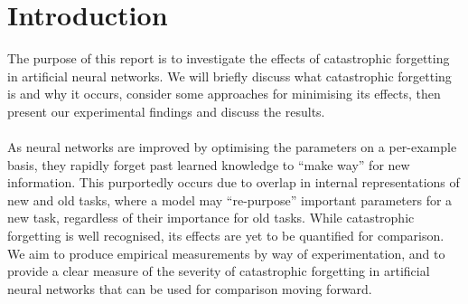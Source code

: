 \documentclass{report}
\begin{document}
	\section{Introduction}
	The purpose of this report is to investigate the effects of catastrophic forgetting in artificial neural networks. We will briefly discuss what catastrophic forgetting is and why it occurs, consider some approaches for minimising its effects, then present our experimental findings and discuss the results. \\
	\\
	As neural networks are improved by optimising the parameters on a per-example basis, they rapidly forget past learned knowledge to ``make way'' for new information. This purportedly occurs due to overlap in internal representations of new and old tasks, where a model may ``re-purpose'' important parameters for a new task, regardless of their importance for old tasks. While catastrophic forgetting is well recognised, its effects are yet to be quantified for comparison. We aim to produce empirical measurements by way of experimentation, and to provide a clear measure of the severity of catastrophic forgetting in artificial neural networks that can be used for comparison moving forward. \par
	
\end{document}
